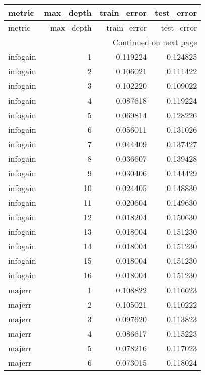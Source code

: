 \begin{longtable}{lrrr}
\toprule
  metric &  max\_depth &  train\_error &  test\_error \\
\midrule
\endfirsthead

\toprule
  metric &  max\_depth &  train\_error &  test\_error \\
\midrule
\endhead
\midrule
\multicolumn{4}{r}{{Continued on next page}} \\
\midrule
\endfoot

\bottomrule
\endlastfoot
infogain &          1 &     0.119224 &    0.124825 \\
infogain &          2 &     0.106021 &    0.111422 \\
infogain &          3 &     0.102220 &    0.109022 \\
infogain &          4 &     0.087618 &    0.119224 \\
infogain &          5 &     0.069814 &    0.128226 \\
infogain &          6 &     0.056011 &    0.131026 \\
infogain &          7 &     0.044409 &    0.137427 \\
infogain &          8 &     0.036607 &    0.139428 \\
infogain &          9 &     0.030406 &    0.144429 \\
infogain &         10 &     0.024405 &    0.148830 \\
infogain &         11 &     0.020604 &    0.149630 \\
infogain &         12 &     0.018204 &    0.150630 \\
infogain &         13 &     0.018004 &    0.151230 \\
infogain &         14 &     0.018004 &    0.151230 \\
infogain &         15 &     0.018004 &    0.151230 \\
infogain &         16 &     0.018004 &    0.151230 \\
  majerr &          1 &     0.108822 &    0.116623 \\
  majerr &          2 &     0.105021 &    0.110222 \\
  majerr &          3 &     0.097620 &    0.113823 \\
  majerr &          4 &     0.086617 &    0.115223 \\
  majerr &          5 &     0.078216 &    0.117023 \\
  majerr &          6 &     0.073015 &    0.118024 \\

\end{longtable}
